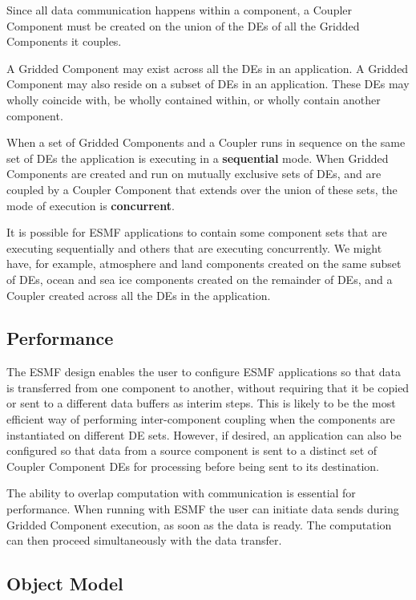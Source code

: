 Since all data communication happens within a component, a Coupler 
Component must be created on the union of the DEs of all
the Gridded Components it couples.  

A Gridded Component may exist across all the DEs in an application.  
A Gridded Component may also reside on a subset of DEs in an 
application.  These DEs may wholly coincide with, be wholly contained 
within, or wholly contain another component.  

When a set of Gridded  Components and a Coupler runs in sequence 
on the same set of DEs the application is executing in a {\bf sequential} 
mode. When Gridded Components are created and run on mutually exclusive
sets of DEs, and are coupled by a Coupler Component that extends over
the union of these sets, the mode of execution is {\bf concurrent}.

It is possible for ESMF applications to contain some component sets
that are executing sequentially and others that are executing concurrently.
We might have, for example, atmosphere and land components created 
on the same subset of DEs, ocean and sea ice components created on 
the remainder of DEs, and a Coupler created across all the DEs in
the application.

\subsection{Performance}
\label{sec:performance}

The ESMF design enables the user to configure ESMF
applications so that data is transferred from one component to another, 
without requiring that it be copied or sent to a different data
buffers as interim steps.  This is likely to be the most efficient way 
of performing inter-component coupling when the components are instantiated 
on different DE sets.  However, if desired, an application can also be 
configured so that data from a source component is sent to a distinct set of 
Coupler Component DEs for processing before being sent to its 
destination.

The ability to overlap computation with communication is essential for
performance.  When running with ESMF the user can initiate data 
sends during Gridded Component execution, as soon as the data is ready.
The computation can then proceed simultaneously with the data transfer.

\newpage
\subsection{Object Model}

